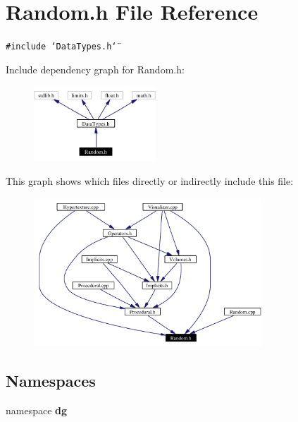 \section{Random.h File Reference}
\label{Random_8h}
{\tt \#include \char`\"{}Data\-Types.h\char`\"{}}\par


Include dependency graph for Random.h:\begin{figure}[H]
\begin{center}
\leavevmode
\includegraphics[width=130pt]{Random_8h__incl}
\end{center}
\end{figure}


This graph shows which files directly or indirectly include this file:\begin{figure}[H]
\begin{center}
\leavevmode
\includegraphics[width=242pt]{Random_8h__dep__incl}
\end{center}
\end{figure}
\subsection*{Namespaces}
\begin{CompactItemize}
\item 
namespace {\bf dg}
\end{CompactItemize}
